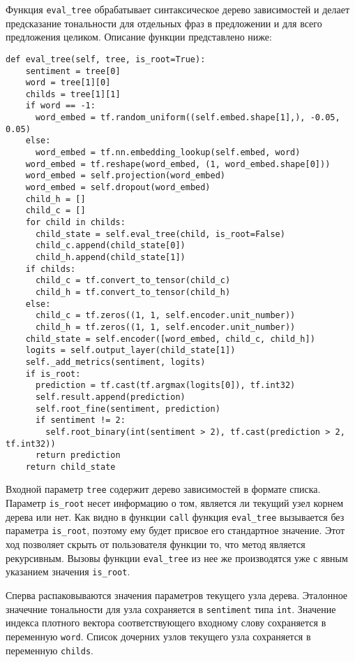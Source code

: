 Функция \texttt{eval\_tree} обрабатывает синтаксическое дерево зависимостей и делает предсказание тональности для отдельных фраз в предложении и для всего предложения целиком. Описание функции представлено ниже:
\medskip
\begin{lstlisting}[style=Python]
  def eval_tree(self, tree, is_root=True):
    sentiment = tree[0]
    word = tree[1][0]
    childs = tree[1][1]
    if word == -1:
      word_embed = tf.random_uniform((self.embed.shape[1],), -0.05, 0.05)
    else:
      word_embed = tf.nn.embedding_lookup(self.embed, word)
    word_embed = tf.reshape(word_embed, (1, word_embed.shape[0]))
    word_embed = self.projection(word_embed)
    word_embed = self.dropout(word_embed)
    child_h = []
    child_c = []
    for child in childs:
      child_state = self.eval_tree(child, is_root=False)
      child_c.append(child_state[0])
      child_h.append(child_state[1])
    if childs:
      child_c = tf.convert_to_tensor(child_c)
      child_h = tf.convert_to_tensor(child_h)
    else:
      child_c = tf.zeros((1, 1, self.encoder.unit_number))
      child_h = tf.zeros((1, 1, self.encoder.unit_number))
    child_state = self.encoder([word_embed, child_c, child_h])
    logits = self.output_layer(child_state[1])
    self._add_metrics(sentiment, logits)
    if is_root:
      prediction = tf.cast(tf.argmax(logits[0]), tf.int32)
      self.result.append(prediction)
      self.root_fine(sentiment, prediction)
      if sentiment != 2:
        self.root_binary(int(sentiment > 2), tf.cast(prediction > 2, tf.int32))
      return prediction
    return child_state
\end{lstlisting}
\medskip

Входной параметр \texttt{tree} содержит дерево зависимостей в формате списка. Параметр \texttt{is\_root} несет информацию о том, является ли текущий узел корнем дерева или нет. Как видно в функции \texttt{call} функция \texttt{eval\_tree} вызывается без параметра \texttt{is\_root}, поэтому ему будет присвое его стандартное значение. Этот ход позволяет скрыть от пользователя функции то, что метод является рекурсивным. Вызовы функции \texttt{eval\_tree} из нее же производятся уже с явным указанием значения \texttt{is\_root}.

Сперва распаковываются значения параметров текущего узла дерева. Эталонное значечние тональности для узла сохраняется в \texttt{sentiment} типа \texttt{int}. Значение индекса плотного вектора соответствующего входному слову сохраняется в переменную \texttt{word}. Список дочерних узлов текущего узла сохраняется в переменную \texttt{childs}.

